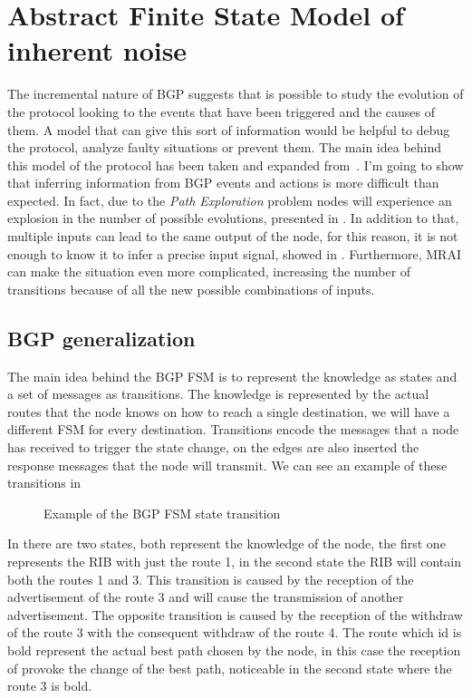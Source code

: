 \chapter{Abstract Finite State Model of inherent noise}
\label{cha:bgp_fsm}

The incremental nature of \ac{BGP} suggests that is possible to study the
evolution of the protocol looking to the events that have been triggered
and the causes of them.
A model that can give this sort of information would be helpful to debug
the protocol, analyze faulty situations or prevent them.
The main idea behind this model of the protocol has been taken and
expanded from~\cite{griffinFSM}.
I'm going to show that inferring information from \ac{BGP} events and actions
is more difficult than expected.
In fact, due to the \textit{Path Exploration} problem
nodes will experience an explosion in the number of possible evolutions,
presented in .
In addition to that, multiple inputs can lead to the same output of the node,
for this reason, it is not enough to know it to infer a precise input signal,
showed in .
Furthermore, \ac{MRAI} can make the situation even more complicated, increasing
the number of transitions because of all the new possible combinations of
inputs.

\section{BGP generalization}
\label{sec:bgp_generalization}

The main idea behind the \ac{BGP} \ac{FSM} is to represent the knowledge as
states and a set of messages as transitions.
The knowledge is represented by the actual routes that the node knows on how
to reach a single destination, we will have a different \ac{FSM} for every
destination.
Transitions encode the messages that a node has received to trigger the state change,
on the edges are also inserted the response messages that the node will transmit.
We can see an example of these transitions in 

\begin{figure}[h]
    \begin{center}
        
    \end{center}
	\caption{Example of the \ac{BGP} \ac{FSM} state transition}
    \label{fig:fsm_example}
\end{figure}

In  there are two states, both represent the knowledge of
the node, the first one represents the \ac{RIB} with just the route \num{1}, in
the second state the \ac{RIB} will contain both the routes \num{1} and \num{3}.
This transition is caused by the reception of the advertisement of the route
\num{3} and will cause the transmission of another advertisement.
The opposite transition is caused by the reception of the withdraw of the route
\num{3} with the consequent withdraw of the route \num{4}.
The route which id is bold represent the actual best path chosen by the node, in
this case the reception of  provoke the change of the best path, noticeable
in the second state where the route \num{3} is bold.

